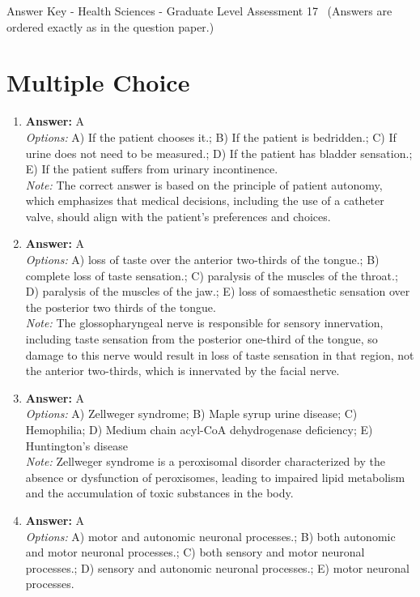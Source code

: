 \documentclass[12pt]{article}
\begin{document}
\begin{center}
Answer Key - Health Sciences - Graduate Level Assessment 17 \
\small (Answers are ordered exactly as in the question paper.)
\end{center}

\section*{Multiple Choice}
\begin{enumerate}[label=\arabic*.]
\item \textbf{Answer:} A
\\ \textit{Options:} A) If the patient chooses it.; B) If the patient is bedridden.; C) If urine does not need to be measured.; D) If the patient has bladder sensation.; E) If the patient suffers from urinary incontinence.
\\ \textit{Note:} The correct answer is based on the principle of patient autonomy, which emphasizes that medical decisions, including the use of a catheter valve, should align with the patient's preferences and choices.
\item \textbf{Answer:} A
\\ \textit{Options:} A) loss of taste over the anterior two-thirds of the tongue.; B) complete loss of taste sensation.; C) paralysis of the muscles of the throat.; D) paralysis of the muscles of the jaw.; E) loss of somaesthetic sensation over the posterior two thirds of the tongue.
\\ \textit{Note:} The glossopharyngeal nerve is responsible for sensory innervation, including taste sensation from the posterior one-third of the tongue, so damage to this nerve would result in loss of taste sensation in that region, not the anterior two-thirds, which is innervated by the facial nerve.
\item \textbf{Answer:} A
\\ \textit{Options:} A) Zellweger syndrome; B) Maple syrup urine disease; C) Hemophilia; D) Medium chain acyl-CoA dehydrogenase deficiency; E) Huntington's disease
\\ \textit{Note:} Zellweger syndrome is a peroxisomal disorder characterized by the absence or dysfunction of peroxisomes, leading to impaired lipid metabolism and the accumulation of toxic substances in the body.
\item \textbf{Answer:} A
\\ \textit{Options:} A) motor and autonomic neuronal processes.; B) both autonomic and motor neuronal processes.; C) both sensory and motor neuronal processes.; D) sensory and autonomic neuronal processes.; E) motor neuronal processes.

\end{enumerate}
\end{document}
